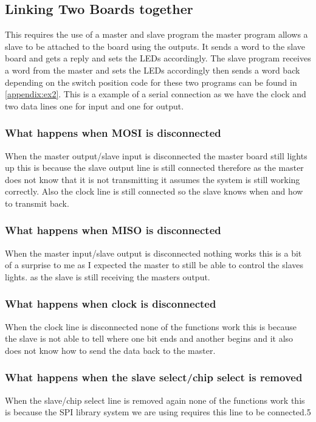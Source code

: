 \documentclass[a4paper,12pt]{scrartcl}
\begin{document}
{		\subsection{Linking Two Boards together}
		{
			This requires the use of a master and slave program the master program allows a slave to be attached to the board using the outputs. It sends a word to the slave board and gets a reply and sets the LEDs accordingly. The slave program receives a word from the master and sets the LEDs accordingly then sends a word back depending on the switch position code for these two programs can be found in \cref{appendix:ex2}. This is a example of a serial connection as we have the clock and two data lines one for input and one for output.
			
			\subsubsection{What happens when MOSI is disconnected}
			{
				When the master output/slave input is disconnected the master board still lights up this is because the slave output line is still connected therefore as the master does not know that it is not transmitting it assumes the system is still working correctly. Also the clock line is still connected so the slave knows when and how to transmit back.
				
			}
			\subsubsection{What happens when MISO is disconnected}
			{
				When the master input/slave output is disconnected nothing works this is a bit of a surprise to me as I expected the master to still be able to control the slaves lights. as the slave is still receiving the masters output.
			}
			\subsubsection{What happens when clock is disconnected}
			{
				When the clock line is disconnected none of the functions work this is because the slave is not able to tell where one bit ends and another begins and it also does not know how to send the data back to the master.
			}
			\subsubsection{What happens when the slave select/chip select is removed}
			{
				When the slave/chip select line is removed again none of the functions work this is because the SPI library system we are using requires this line to be connected.5
			}
		}
}
\end{document}

